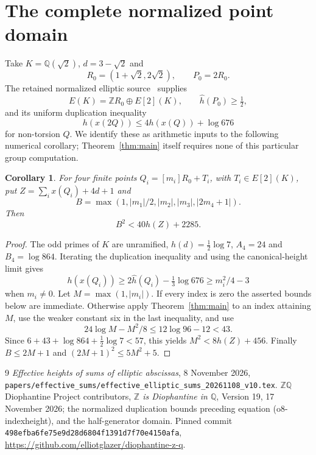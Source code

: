 \documentclass[11pt,a4paper]{article}
\newtheorem{corollary}[theorem]{Corollary}
\newcommand{\Q}{\mathbb Q}\newcommand{\Z}{\mathbb Z}
\begin{document}
\section{The complete normalized point domain}

Take $K=\Q(\sqrt2)$, $d=3-\sqrt2$ and
\[
 R_0=(1+\sqrt2,2\sqrt2),\qquad P_0=2R_0.
\]
The retained normalized elliptic source~\cite{Source} supplies
\[
 E(K)=\Z R_0\oplus E[2](K),\qquad
 \widehat h(P_0)\ge\tfrac12,
\]
and its uniform duplication inequality
\[
 h(x(2Q))\le4h(x(Q))+\log676
\]
for non-torsion $Q$. We identify these as arithmetic inputs to
the following numerical corollary; Theorem~\ref{thm:main} itself
requires none of this particular group computation.

\begin{corollary}\label{cor:four}
For four finite points $Q_i=[m_i]R_0+T_i$, with $T_i\in E[2](K)$,
put $Z=\sum_i x(Q_i)+4d+1$ and
\[
 B=\max(1,|m_1|/2,|m_2|,|m_3|,|2m_4+1|).
\]
Then
\[
                         B^2<40h(Z)+2285.
\]
\end{corollary}
\begin{proof}
The odd primes of $K$ are unramified, $h(d)=\tfrac12\log7$,
$A_4=24$ and $B_4=\log864$.
Iterating the duplication inequality and using the canonical-height
limit gives
\[
 h(x(Q_i))\ge2\widehat h(Q_i)-\tfrac13\log676
             \ge m_i^2/4-3
\]
when $m_i\ne0$. Let $M=\max(1,|m_i|)$.
If every index is zero the asserted bounds below are immediate.
Otherwise apply Theorem~\ref{thm:main} to an index attaining $M$,
use the weaker constant six in the last inequality, and use
\[
 24\log M-M^2/8\le12\log96-12<43.
\]
Since $6+43+\log864+\tfrac12\log7<57$, this yields
$M^2<8h(Z)+456$.
Finally $B\le2M+1$ and $(2M+1)^2\le5M^2+5$.
\end{proof}

\begin{thebibliography}{9}
\emph{Effective heights of sums of elliptic abscissas},
8 November 2026,
\nolinkurl{papers/effective_sums/effective_elliptic_sums_20261108_v10.tex}.
\(\Z\Q\) Diophantine Project contributors,
\emph{$\Z$ is Diophantine in $\Q$}, Version 19,
17 November 2026; the normalized duplication bounds preceding
equation \textup{(o8-indexheight)}, and the half-generator domain.
Pinned commit \texttt{498efba6fe75e9d28d6804f1391d7f70e4150afa},
\url{https://github.com/elliotglazer/diophantine-z-q}.
\end{thebibliography}
\end{document}
